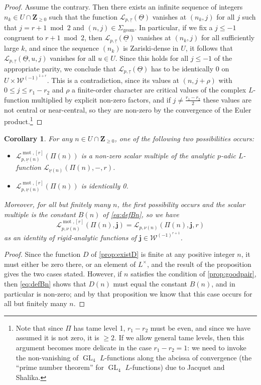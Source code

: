 \documentclass[cjm]{ipart}
\theoremstyle{plain}
\newtheorem{corollary}[theorem]{Corollary}
\theoremstyle{remark}
\DeclareMathOperator{\GL}{GL}
\DeclareMathOperator{\mot}{mot}
\newcommand{\ZZ}{\mathbf{Z}}
\newcommand{\bfj}{\mathbf{j}}
\newcommand{\cL}{\mathcal{L}}
\newcommand{\cW}{\mathcal{W}}
\newcommand{\uTh}{\underline{\Theta}}
\newcommand{\unu}{\underline{\nu}}
\newcommand{\utau}{\underline{\tau}}
\numberwithin{equation}{subsection}
\renewcommand{\le}{\leqslant}
\renewcommand{\ge}{\geqslant}
\begin{document}
  \begin{proof}
   Assume the contrary. Then there exists an infinite sequence of integers $n_k \in U \cap \ZZ_{\ge 0}$ such that the function $\cL_{p,\utau}(\uTh)$ vanishes at $(n_k, j)$ for all $j$ such that $j = r + 1 \bmod 2$ and $(n, j) \in \Sigma_{\mathrm{geom}}$. In particular, if we fix a $j \le -1$ congruent to $r+1 \bmod 2$, then $\cL_{p,\utau}(\uTh)$ vanishes at $(n_k, j)$ for all sufficiently large $k$, and since the sequence $(n_k)$ is Zariski-dense in $U$, it follows that $\cL_{p,\utau}(\uTh, u, j)$ vanishes for all $u \in U$. Since this holds for all $j \le -1$ of the appropriate parity, we conclude that $\cL_{p,\utau}(\uTh)$ has to be identically 0 on $U \times \cW^{(-1)^{1+r}}$. This is a contradiction, since its values at $(n, j+\rho)$ with $0 \le j \le r_1 - r_2$ and $\rho$ a finite-order character are critical values of the complex $L$-function multiplied by explicit non-zero factors, and if $j \ne \tfrac{r_1-r_2}{2}$ these values are not central or near-central, so they are non-zero by the convergence of the Euler product.\footnote{Note that since $\Pi$ has tame level 1, $r_1 -r_2$ must be even, and since we have assumed it is not zero, it is $\ge 2$. If we allow general tame levels, then this argument becomes more delicate in the case $r_1 - r_2 = 1$: we need to invoke the non-vanishing of $\GL_4$ $L$-functions along the abcissa of convergence (the ``prime number theorem'' for $\GL_4$ $L$-functions) due to Jacquet and Shalika.}
  \end{proof}

  \begin{corollary}
   For any $n \in U \cap \ZZ_{\ge 0}$, one of the following two possibilities occurs:
   \begin{itemize}
    \item $\cL^{\mot, [r]}_{p, \unu(n)}(\Pi(n))$ is a non-zero scalar multiple of the analytic $p$-adic $L$-function $\cL_{\unu(n)}(\Pi(n),-, r)$.
    \item $\cL^{\mot, [r]}_{p, \unu(n)}(\Pi(n))$ is identically 0.
   \end{itemize}
   Moreover, for all but finitely many $n$, the first possibility occurs and the scalar multiple is the constant $B(n)$ of \cref{eq:defBn}, so we have
   \[ \cL_{p, \nu(n)}^{\mot, [r]}(\Pi(n), \bfj) = \cL_{p, \nu(n)}(\Pi(n), \bfj, r) \]
   as an identity of rigid-analytic functions of $\bfj \in \cW^{(-1)^{r+1}}$.
  \end{corollary}

  \begin{proof}
   Since the function $D$ of \cref{prop:existD} is finite at any positive integer $n$, it must either be zero there, or an element of $L^\times$, and the result of the proposition gives the two cases stated. However, if $n$ satisfies the condition of \cref{prop:goodpair}, then \cref{eq:defBn} shows that $D(n)$ must equal the constant $B(n)$, and in particular is non-zero; and by that proposition we know that this case occurs for all but finitely many $n$.
  \end{proof}
\end{document}
